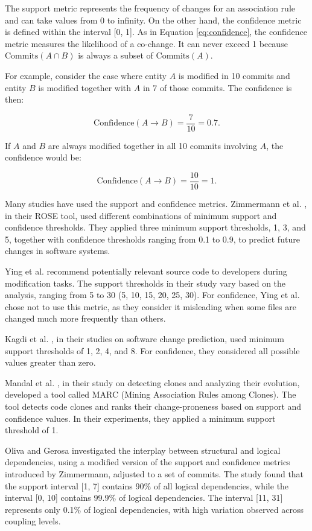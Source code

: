 The support metric represents the frequency of changes for an association rule and can take values from 0 to infinity. On the other hand, the confidence metric is defined within the interval [0, 1]. As in Equation \eqref{eq:confidence}, the confidence metric measures the likelihood of a co-change. It can never exceed 1 because $\text{Commits}(A \cap B)$ is always a subset of $\text{Commits}(A)$.


 For example, consider the case where entity $A$ is modified in 10 commits and entity $B$ is modified together with $A$ in 7 of those commits. The confidence is then:

\[
\text{Confidence}(A \rightarrow B) = \frac{7}{10} = 0.7.
\]

If $A$ and $B$ are always modified together in all 10 commits involving $A$, the confidence would be:

\[
\text{Confidence}(A \rightarrow B) = \frac{10}{10} = 1.
\]



Many studies have used the support and confidence metrics. Zimmermann et al. \cite{Zimmermann:2004:MVH:998675.999460}, in their ROSE tool, used different combinations of minimum support and confidence thresholds. They applied three minimum support thresholds, 1, 3, and 5, together with confidence thresholds ranging from 0.1 to 0.9, to predict future changes in software systems.

Ying et al. \cite{Ying-co-change} recommend potentially relevant source code to developers during modification tasks. The support thresholds in their study vary based on the analysis, ranging from 5 to 30 (5, 10, 15, 20, 25, 30). For confidence, Ying et al. chose not to use this metric, as they consider it misleading when some files are changed much more frequently than others.

Kagdi et al. \cite{article-Kagdi-commit}, in their studies on software change prediction, used minimum support thresholds of 1, 2, 4, and 8. For confidence, they considered all possible values greater than zero.

Mandal et al. \cite{Mandal-clones}, in their study on detecting clones and analyzing their evolution, developed a tool called MARC (Mining Association Rules among Clones). The tool detects code clones and ranks their change-proneness based on support and confidence values. In their experiments, they applied a minimum support threshold of 1.

Oliva and Gerosa \cite{Oliva:2011:ISL:2067853.2068086, OlivaG152} investigated the interplay between structural and logical dependencies, using a modified version of the support and confidence metrics introduced by Zimmermann, adjusted to a set of commits. The study found that the support interval [1, 7] contains 90\% of all logical dependencies, while the interval [0, 10] contains 99.9\% of logical dependencies. The interval [11, 31] represents only 0.1\% of logical dependencies, with high variation observed across coupling levels.

